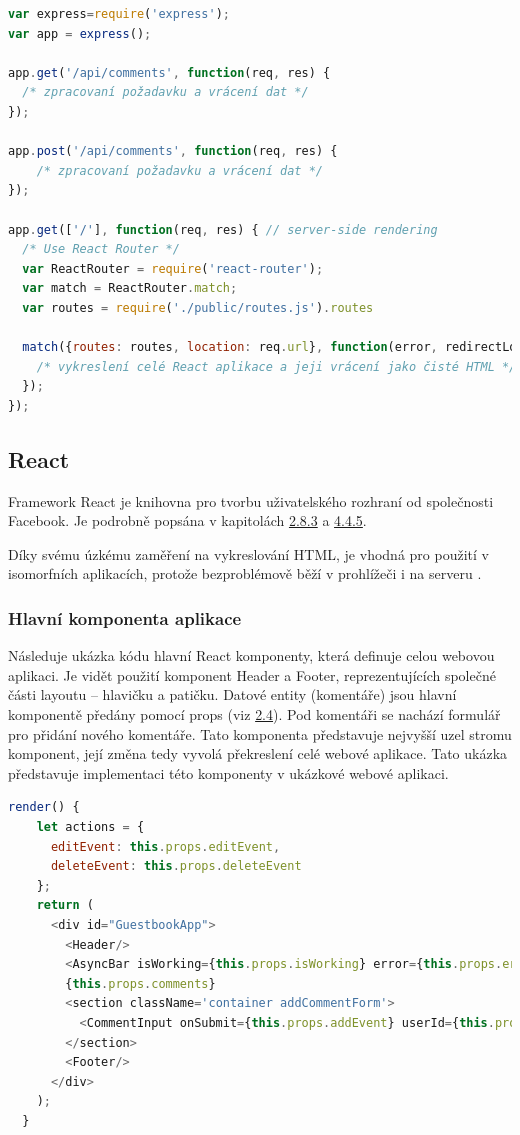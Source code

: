 \begin{lstlisting}[language=Javascript,caption={Ukázka konfigurace serverového JS frameworku Express}]
var express=require('express');
var app = express();

app.get('/api/comments', function(req, res) {
  /* zpracovaní požadavku a vrácení dat */
});

app.post('/api/comments', function(req, res) {
    /* zpracovaní požadavku a vrácení dat */
});

app.get(['/'], function(req, res) { // server-side rendering
  /* Use React Router */
  var ReactRouter = require('react-router');
  var match = ReactRouter.match;
  var routes = require('./public/routes.js').routes

  match({routes: routes, location: req.url}, function(error, redirectLocation, renderProps) {
    /* vykreslení celé React aplikace a jeji vrácení jako čisté HTML */
  });
});
\end{lstlisting}

\subsection{React}
Framework React je knihovna pro tvorbu uživatelského rozhraní od společnosti Facebook. Je podrobně popsána v kapitolách \hyperref[sec:react]{2.8.3} a \hyperref[sec:react_isomoprhic]{4.4.5}.

Díky svému úzkému zaměření na vykreslování HTML, je vhodná pro použití v isomorfních aplikacích, protože bezproblémově běží v prohlížeči i na serveru \cite{react}. 

\subsubsection{Hlavní komponenta aplikace}
Následuje ukázka kódu hlavní React komponenty, která definuje celou webovou aplikaci. Je vidět použití komponent Header a Footer, reprezentujících společné části layoutu – hlavičku a patičku. Datové entity (komentáře) jsou hlavní komponentě předány pomocí props (viz \hyperref[sec:react_props]{2.4}). Pod komentáři se nachází formulář pro přidání nového komentáře. Tato komponenta představuje nejvyšší uzel stromu komponent, její změna tedy vyvolá překreslení celé webové aplikace. Tato ukázka představuje implementaci této komponenty v ukázkové webové aplikaci.
\begin{lstlisting}[language=Javascript,caption={Render metoda hlavní React komponenty GuestbookApp}]
  render() {
    let actions = { 
      editEvent: this.props.editEvent, 
      deleteEvent: this.props.deleteEvent
    };
    return (
      <div id="GuestbookApp">
        <Header/>
        <AsyncBar isWorking={this.props.isWorking} error={this.props.error} />
        {this.props.comments}
        <section className='container addCommentForm'>
          <CommentInput onSubmit={this.props.addEvent} userId={this.props.userId} textLabel='What happened?' authorLabel='Your nickname' valueLabel='Rating' />
        </section>
        <Footer/>
      </div>
    );
  }
\end{lstlisting}

